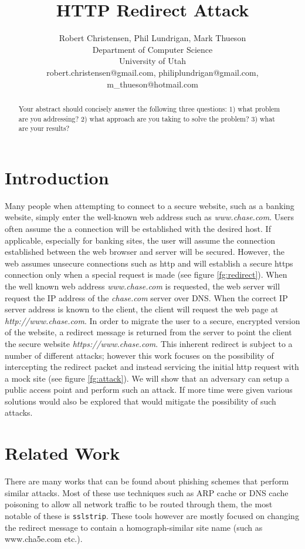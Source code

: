 \documentclass{article}
\title{HTTP Redirect Attack}
\author{Robert Christensen, Phil Lundrigan, Mark Thueson\\
Department of Computer Science\\
University of Utah \\
robert.christensen@gmail.com, philiplundrigan@gmail.com, m\_thueson@hotmail.com}
\begin{document}
\maketitle

\begin{abstract}
Your abstract should concisely answer the following three questions: 1) what problem are you addressing? 2) what approach are you taking to solve the problem? 3) what are your results?
\end{abstract}

\section{Introduction}
Many people when attempting to connect to a secure website, such as a banking website, simply enter the well-known web address such as {\em www.chase.com}. Users often assume the a connection will be established with the desired host.  If applicable, especially for banking sites, the user will assume the connection established between the web browser and server will be secured.  However, the web assumes unsecure connections such as http and will establish a secure https connection only when a special request is made (see figure \ref{fg:redirect}).  When the well known web address {\em www.chase.com} is requested, the web server will request the IP address of the {\em chase.com} server over DNS.  When the correct IP server address is known to the client, the client will request the web page at {\em http://www.chase.com}.  In order to migrate the user to a secure, encrypted version of the website, a redirect message is returned from the server to point the client the secure website {\em https://www.chase.com}.  This inherent redirect is subject to a number of different attacks; however this work focuses on the possibility of intercepting the redirect packet and instead servicing the initial http request with a mock site \cite{offpath} (see figure \ref{fg:attack}).  We will show that an adversary can setup a public access point and perform such an attack.  If more time were given various solutions would also be explored that would mitigate the possibility of such attacks.


\section{Related Work}
There are many works that can be found about phishing schemes that perform similar attacks.  Most of these use techniques such as ARP cache or DNS cache poisoning to allow all network traffic to be routed through them, the most notable of these is \texttt{sslstrip}\cite{sslstrip}.  These tools however are mostly focused on changing the redirect message to contain a homograph-similar site name (such as www.cha5e.com etc.).
\end{document}
